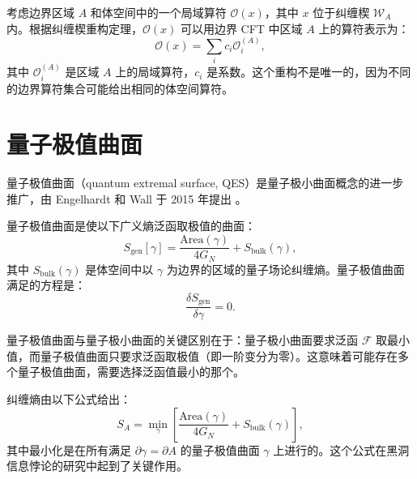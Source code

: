 \begin{example}[单个算符的重构]
考虑边界区域 $A$ 和体空间中的一个局域算符 $\mathcal{O}(x)$，其中 $x$ 位于纠缠楔 $\mathcal{W}_A$ 内。根据纠缠楔重构定理，$\mathcal{O}(x)$ 可以用边界 CFT 中区域 $A$ 上的算符表示为：
\begin{equation}
    \mathcal{O}(x) = \sum_i c_i \mathcal{O}_i^{(A)},
\end{equation}
其中 $\mathcal{O}_i^{(A)}$ 是区域 $A$ 上的局域算符，$c_i$ 是系数。这个重构不是唯一的，因为不同的边界算符集合可能给出相同的体空间算符。
\end{example}

\section{量子极值曲面}

量子极值曲面（quantum extremal surface, QES）是量子极小曲面概念的进一步推广，由 Engelhardt 和 Wall 于 2015 年提出 \cite{Engelhardt2015}。

\begin{definition}[量子极值曲面]
量子极值曲面是使以下广义熵泛函取极值的曲面：
\begin{equation}
    S_{\text{gen}}[\gamma] = \frac{\text{Area}(\gamma)}{4G_N} + S_{\text{bulk}}(\gamma),
\end{equation}
其中 $S_{\text{bulk}}(\gamma)$ 是体空间中以 $\gamma$ 为边界的区域的量子场论纠缠熵。量子极值曲面满足的方程是：
\begin{equation}
    \frac{\delta S_{\text{gen}}}{\delta \gamma} = 0.
\end{equation}
\end{definition}

\begin{remark}[量子极值曲面与量子极小曲面的区别]
量子极值曲面与量子极小曲面的关键区别在于：量子极小曲面要求泛函 $\mathcal{F}$ 取最小值，而量子极值曲面只要求泛函取极值（即一阶变分为零）。这意味着可能存在多个量子极值曲面，需要选择泛函值最小的那个。
\end{remark}

\begin{theorem}[量子极值曲面公式] \label{thm:QES_formula}
纠缠熵由以下公式给出：
\begin{equation}
    S_A = \min_{\gamma} \left[ \frac{\text{Area}(\gamma)}{4G_N} + S_{\text{bulk}}(\gamma) \right],
\end{equation}
其中最小化是在所有满足 $\partial \gamma = \partial A$ 的量子极值曲面 $\gamma$ 上进行的。这个公式在黑洞信息悖论的研究中起到了关键作用。
\end{theorem}

